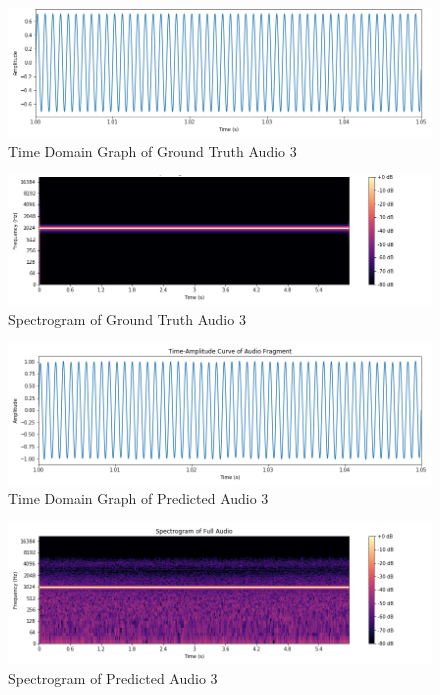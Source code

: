 \documentclass{ioereport}
\begin{document}
    \begin{figure}[H]
        \centering
        \includegraphics[width=\linewidth]{assets/audio_results/puretone1000hztime.png}
        \caption{Time Domain Graph of Ground Truth Audio 3}
        \label{fig:gt-pure1000-time}
    \end{figure}
    \begin{figure}[H]
        \centering
        \includegraphics[width=\linewidth]{assets/audio_results/puretone1000hzspec.png}
        \caption{Spectrogram of Ground Truth Audio 3}
        \label{fig:gt-pure1000-spec}
    \end{figure}
    
    \begin{figure}[H]
        \centering
        \includegraphics[width=\linewidth]{assets/audio_results/predpuretone1000hztime.png}
        \caption{Time Domain Graph of Predicted Audio 3}
        \label{fig:pred-pure1000-time}
    \end{figure}
    \begin{figure}[H]
        \centering
        \includegraphics[width=\linewidth]{assets/audio_results/predpuretone1000hzspec.png}
        \caption{Spectrogram of Predicted Audio 3}
        \label{fig:pred-pure1000-spec}
    \end{figure}
\end{document}
